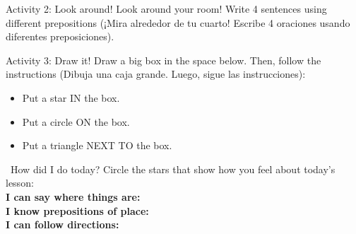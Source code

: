\begin{activity}{Activity 2: Look around!}
  Look around your room! Write 4 sentences using different prepositions (¡Mira alrededor de tu cuarto! Escribe 4 oraciones usando diferentes preposiciones).
  \writinglines[4]
\end{activity}

\begin{activity}{Activity 3: Draw it! }
  Draw a big box in the space below. Then, follow the instructions (Dibuja una caja grande. Luego, sigue las instrucciones):
  \begin{itemize}
    \item Put a star IN the box.
    \item Put a circle ON the box.
    \item Put a triangle NEXT TO the box.
  \end{itemize}
  \vspace{4cm} %
\end{activity}

\vspace{1em}
\begin{grammartip}{ \ How did I do today?}
  Circle the stars that show how you feel about today's lesson:\\[6pt]
  \textbf{I can say where things are:} \selfcheck[0] \\[4pt]
  \textbf{I know prepositions of place:} \selfcheck[0] \\[4pt]
  \textbf{I can follow directions:} \selfcheck[0]
\end{grammartip}
